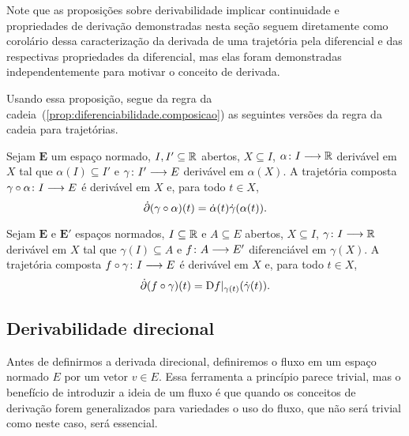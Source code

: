 Note que as proposições sobre derivabilidade implicar continuidade e propriedades de derivação demonstradas nesta seção seguem diretamente como corolário dessa caracterização da derivada de uma trajetória pela diferencial e das respectivas propriedades da diferencial, mas elas foram demonstradas independentemente para motivar o conceito de derivada.

Usando essa proposição, segue da regra da cadeia~(\ref{prop:diferenciabilidade.composicao}) as seguintes versões da regra da cadeia para trajetórias.

\begin{exercise}
\label{prop:diferenciabilidade.composicao.trajetorias.reparametrizadas}
Sejam $\bm E$ um espaço normado, $I, I' \subseteq \mathbb{R}$ abertos, $X \subseteq I$, $\alpha\colon \allowbreak I \longrightarrow \mathbb{R}$ derivável em $X$ tal que $\alpha(I) \subseteq I'$ e $\gamma\colon \allowbreak I' \longrightarrow E$ derivável em $\alpha(X)$. A trajetória composta $\gamma \circ \alpha\colon \allowbreak I \longrightarrow E$ é derivável em $X$ e, para todo $t \in X$,
	\begin{equation*}
	\dot{\partial} (\gamma \circ \alpha)(t) = \dot\alpha(t)\dot\gamma(\alpha(t)).
	\end{equation*}
\end{exercise}

\begin{exercise}
\label{prop:diferenciabilidade.composicao.trajetorias.empurrada}
Sejam $\bm E$ e $\bm E'$ espaços normados, $I \subseteq \mathbb{R}$ e $A \subseteq E$ abertos, $X \subseteq I$, $\gamma\colon \allowbreak I \longrightarrow \mathbb{R}$ derivável em $X$ tal que $\gamma(I) \subseteq A$ e $f\colon \allowbreak A \longrightarrow E'$ diferenciável em $\gamma(X)$. A trajetória composta $f \circ \gamma\colon \allowbreak I \longrightarrow E$ é derivável em $X$ e, para todo $t \in X$,
	\begin{equation*}
	\dot{\partial} (f \circ \gamma)(t) = \mathrm{D} f|_{\gamma(t)} (\dot\gamma(t)).
	\end{equation*}
\end{exercise}




\subsection{Derivabilidade direcional}

Antes de definirmos a derivada direcional, definiremos o fluxo em um espaço normado $E$ por um vetor $v \in E$. Essa ferramenta a princípio parece trivial, mas o benefício de introduzir a ideia de um fluxo é que quando os conceitos de derivação forem generalizados para variedades o uso do fluxo, que não será trivial como neste caso, será essencial.

